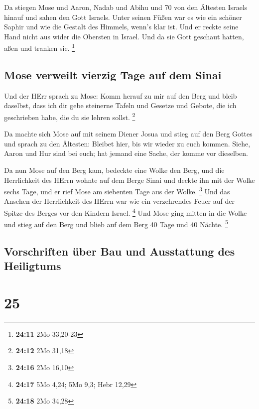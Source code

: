  Da stiegen Mose und Aaron, Nadab und Abihu und 70 von den
Ältesten Israels hinauf  und sahen den Gott Israels.
Unter seinen Füßen war es wie ein schöner Saphir und wie die Gestalt des
Himmels, wenn's klar ist.  Und er reckte seine Hand nicht
aus wider die Obersten in Israel. Und da sie Gott geschaut hatten, aßen
und tranken sie. \footnote{\textbf{24:11} 2Mo 33,20-23}

\hypertarget{mose-verweilt-vierzig-tage-auf-dem-sinai}{%
\subsection{Mose verweilt vierzig Tage auf dem
Sinai}\label{mose-verweilt-vierzig-tage-auf-dem-sinai}}

 Und der HErr sprach zu Mose: Komm herauf zu mir auf den
Berg und bleib daselbst, dass ich dir gebe steinerne Tafeln und Gesetze
und Gebote, die ich geschrieben habe, die du sie lehren sollst.
\footnote{\textbf{24:12} 2Mo 31,18}

 Da machte sich Mose auf mit seinem Diener Josua und
stieg auf den Berg Gottes  und sprach zu den Ältesten:
Bleibet hier, bis wir wieder zu euch kommen. Siehe, Aaron und Hur sind
bei euch; hat jemand eine Sache, der komme vor dieselben.

 Da nun Mose auf den Berg kam, bedeckte eine Wolke den
Berg,  und die Herrlichkeit des HErrn wohnte auf dem
Berge Sinai und deckte ihn mit der Wolke sechs Tage, und er rief Mose am
siebenten Tage aus der Wolke. \footnote{\textbf{24:16} 2Mo 16,10}
 Und das Ansehen der Herrlichkeit des HErrn war wie ein
verzehrendes Feuer auf der Spitze des Berges vor den Kindern Israel.
\footnote{\textbf{24:17} 5Mo 4,24; 5Mo 9,3; Hebr 12,29} 
Und Mose ging mitten in die Wolke und stieg auf den Berg und blieb auf
dem Berg 40 Tage und 40 Nächte. \footnote{\textbf{24:18} 2Mo 34,28}

\hypertarget{vorschriften-uxfcber-bau-und-ausstattung-des-heiligtums}{%
\subsection{Vorschriften über Bau und Ausstattung des
Heiligtums}\label{vorschriften-uxfcber-bau-und-ausstattung-des-heiligtums}}

\hypertarget{section-24}{%
\section{25}\label{section-24}}

